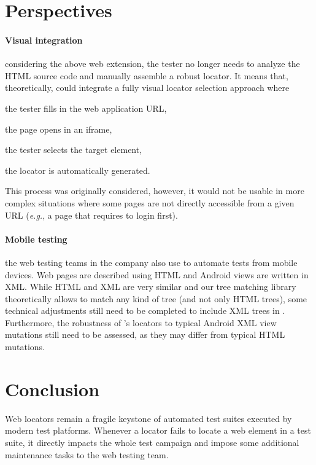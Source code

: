 \section{Perspectives}\label{sec:perspectives}
\paragraph{Visual integration}
considering the above \erratum web extension, the tester no longer needs to analyze the HTML source code and manually assemble a robust locator.
It means that, theoretically, \cerberus could integrate a fully visual locator selection approach where
\begin{inparaenum}[\em (i)]
    \item the tester fills in the web application URL,
    \item the page opens in an iframe,
    \item the tester selects the target element,
    \item the \erratum locator is automatically generated.
\end{inparaenum}
This process was originally considered, however, it would not be usable in more complex situations where some pages are not directly accessible from a given URL (\emph{e.g.}, a page that requires to login first).

\paragraph{Mobile testing}
the web testing teams in the \laredoute{} company also use \cerberus to automate tests from mobile devices.
Web pages are described using HTML and Android views are written in XML.
While HTML and XML are very similar and our tree matching library theoretically allows \erratum to match any kind of tree (and not only HTML trees), some technical adjustments still need to be completed to include XML trees in \cerberus.
Furthermore, the robustness of \erratum's locators to typical Android XML view mutations still need to be assessed, as they may differ from typical HTML mutations.

\section{Conclusion}\label{sec:conclusion}
Web locators remain a fragile keystone of automated test suites executed by modern test platforms.
Whenever a locator fails to locate a web element in a test suite, it directly impacts the whole test campaign and impose some additional maintenance tasks to the web testing team.

